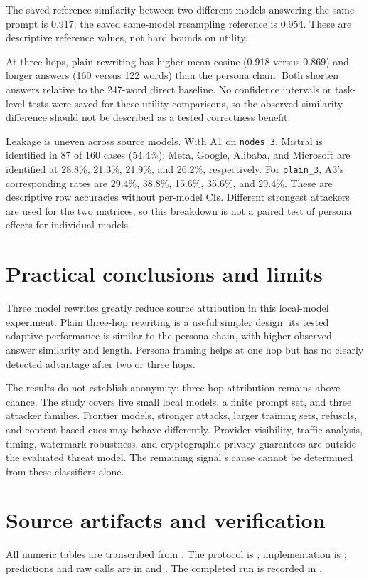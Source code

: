 \documentclass[11pt]{article}
\newcommand{\cond}[1]{\texttt{#1}}
\begin{document}
The saved reference similarity between two different models answering the
same prompt is 0.917; the saved same-model resampling reference is 0.954.
These are descriptive reference values, not hard bounds on utility.

At three hops, plain rewriting has higher mean cosine (0.918 versus 0.869)
and longer answers (160 versus 122 words) than the persona chain. Both shorten
answers relative to the 247-word direct baseline. No confidence intervals or
task-level tests were saved for these utility comparisons, so the observed
similarity difference should not be described as a tested correctness benefit.

Leakage is uneven across source models. With A1 on \cond{nodes\_3}, Mistral is
identified in 87 of 160 cases (54.4\%); Meta, Google, Alibaba, and Microsoft
are identified at 28.8\%, 21.3\%, 21.9\%, and 26.2\%, respectively. For
\cond{plain\_3}, A3's corresponding rates are 29.4\%, 38.8\%, 15.6\%,
35.6\%, and 29.4\%. These are descriptive row accuracies without per-model CIs.
Different strongest attackers are used for the two matrices, so this breakdown
is not a paired test of persona effects for individual models.

\section{Practical conclusions and limits}
Three model rewrites greatly reduce source attribution in this local-model
experiment. Plain three-hop rewriting is a useful simpler design: its tested
adaptive performance is similar to the persona chain, with higher observed
answer similarity and length. Persona framing helps at one hop but has no
clearly detected advantage after two or three hops.

The results do not establish anonymity: three-hop attribution remains above
chance. The study covers five small local models, a finite prompt set, and
three attacker families. Frontier models, stronger attacks, larger training
sets, refusals, and content-based cues may behave differently. Provider
visibility, traffic analysis, timing, watermark robustness, and cryptographic
privacy guarantees are outside the evaluated threat model. The remaining
signal's cause cannot be determined from these classifiers alone.

\section{Source artifacts and verification}
All numeric tables are transcribed from .
The protocol is ; implementation is
; predictions and raw calls are in
 and .
The completed run is recorded in .
\end{document}
